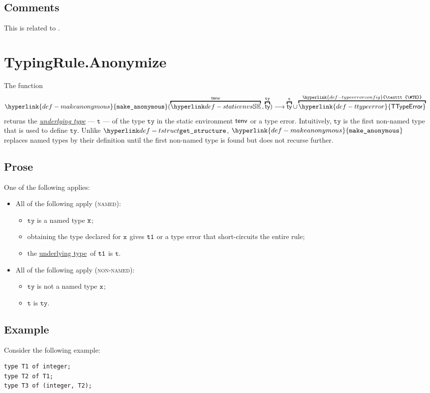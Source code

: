 \documentclass{book}
\newcommand\TTypeError[0]{\hyperlink{def-ttypeerror}{\textsf{TTypeError}}}
\newcommand\TypeErrorConfig[0]{\hyperlink{def-typeerrorconfig}{\texttt{\#TE}}}
\newcommand\ProseOrTypeError[0]{or a type error that short-circuits the entire rule}
\newcommand\makeanonymous[0]{\hyperlink{def-makeanonymous}{\texttt{make\_anonymous}}}
\newcommand\underlyingtype[0]{\hyperlink{def-underlyingtype}{underlying type}}
\newcommand\vt[0]{\texttt{t}}
\newcommand\tty[0]{\texttt{ty}}
\begin{document}
\subsection{Comments}
This is related to .

\section{TypingRule.Anonymize \label{sec:anonymize}}
\hypertarget{def-makeanonymous}{}
\hypertarget{def-underlyingtype}{}
The function
\[
  \makeanonymous(\overname{\staticenvs}{\tenv} \aslsep \overname{\ty}{\tty}) \aslto \overname{\ty}{\vt} \cup \overname{\TTypeError}{\TypeErrorConfig}
\]
returns the \emph{\underlyingtype} --- $\vt$ --- of the type $\tty$ in the static environment $\textsf{tenv}$ or a type error.
Intuitively, $\tty$ is the first non-named type that is used to define $\tty$. Unlike $\tstruct$,
$\makeanonymous$ replaces named types by their definition until the first non-named type is found but
does not recurse further.

\subsection{Prose}
One of the following applies:
\begin{itemize}
  \item All of the following apply (\textsc{named}):
  \begin{itemize}
    \item $\tty$ is a named type $\texttt{x}$;
    \item obtaining the type declared for $\texttt{x}$ gives $\texttt{t1}$ \ProseOrTypeError;
    \item the \underlyingtype\ of $\texttt{t1}$ is $\vt$.
  \end{itemize}

  \item All of the following apply (\textsc{non-named}):
  \begin{itemize}
    \item $\tty$ is not a named type $\texttt{x}$;
    \item $\vt$ is $\tty$.
  \end{itemize}
\end{itemize}

\subsection{Example}
Consider the following example:
\begin{verbatim}
type T1 of integer;
type T2 of T1;
type T3 of (integer, T2);
\end{verbatim}
\end{document}
